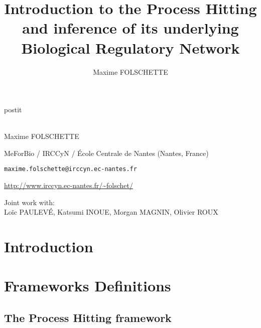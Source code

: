 \documentclass[fleqn,8pt,t]{beamer}
\date{\thedate}
\title[Introduction to the PH and inference of its underlying BRN]{Introduction to the Process Hitting and inference of its underlying Biological Regulatory Network}
\author{Maxime FOLSCHETTE}
\newcommand{\ex}[1]{\textcolor{couleurex}{#1}}
\newcommand{\tcite}[1]{\textcolor{couleurcit}{[#1]}}
\newcommand{\tval}[1]{\textbf{#1}}
\begin{document}
\begin{frame}[plain,label=title]

\begin{center}
\vspace{1cm}
\begin{beamercolorbox}[sep=0.5em]{postit}
\centering
\Large
\textbf{%
{\normalsize\theconference{}}\\~\\%
\inserttitle
}
\end{beamercolorbox}

\par
\medskip
\bigskip
\normalsize
Maxime FOLSCHETTE

\medskip
\footnotesize
MeForBio / IRCCyN / École Centrale de Nantes (Nantes, France)

\texttt{maxime.folschette@irccyn.ec-nantes.fr}

\url{http://www.irccyn.ec-nantes.fr/~folschet/}

\bigskip
Joint work with:
\\
\normalsize
Loïc PAULEVÉ, Katsumi INOUE, Morgan MAGNIN, Olivier ROUX
\end{center}

\end{frame}



\newcommand{\cmodels}{\bigskip
\quad\tval{\ex{egfr20}}: \tcite{Epidermal Growth Factor Receptor, by Özgür Sahin \textit{et al.}}\\
\quad\tval{\ex{egfr104}}: \tcite{Epidermal Growth Factor Receptor, by Regina Samaga \textit{et al.}}\\
\quad\tval{\ex{tcrsig40}}: \tcite{T-Cell Receptor Signaling, by Steffen Klamt \textit{et al.}}\\
\quad\tval{\ex{tcrsig94}}: \tcite{T-Cell Receptor Signaling, by Julio Saez-Rodriguez \textit{et al.}}\\}

\section{Introduction}


\section{Frameworks Definitions}
\subsection{The Process Hitting framework}
%
\end{document}
